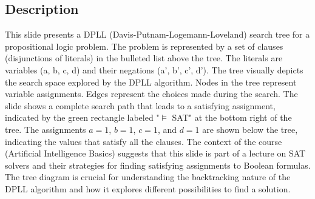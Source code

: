\documentclass{article}%
\begin{document}
%
\subsection{Description}%
This slide presents a DPLL (Davis-Putnam-Logemann-Loveland) search tree for a propositional logic problem. The problem is represented by a set of clauses (disjunctions of literals) in the bulleted list above the tree. The literals are variables (a, b, c, d) and their negations (a', b', c', d'). The tree visually depicts the search space explored by the DPLL algorithm.  Nodes in the tree represent variable assignments. Edges represent the choices made during the search.  The slide shows a complete search path that leads to a satisfying assignment, indicated by the green rectangle labeled "$\models$ SAT" at the bottom right of the tree.  The assignments $a=1$, $b=1$, $c=1$, and $d=1$ are shown below the tree, indicating the values that satisfy all the clauses. The context of the course (Artificial Intelligence Basics) suggests that this slide is part of a lecture on SAT solvers and their strategies for finding satisfying assignments to Boolean formulas. The tree diagram is crucial for understanding the backtracking nature of the DPLL algorithm and how it explores different possibilities to find a solution.%
\end{document}
